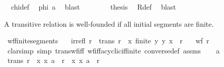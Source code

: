 \begin{isabellebody}
\ {\isacharasterisk}{\kern0pt}{\isacharasterisk}{\kern0pt}\ chi{\isacharunderscore}{\kern0pt}def\ \isamarkupfalse%
\ {\isachardoublequoteopen}phi\ a{\isachardoublequoteclose}\ \isamarkupfalse%
\ blast\isanewline
\ \ \isamarkupfalse%
\isanewline
\ \ \isamarkupfalse%
\ \isamarkupfalse%
\ {\isacharquery}{\kern0pt}thesis\ \isamarkupfalse%
\ R{\isacharunderscore}{\kern0pt}def\ \isamarkupfalse%
\ blast\isanewline
{}\isamarkupfalse%
%
\endisatagproof
{\isafoldproof}%
%
\isadelimproof
%
\endisadelimproof
%
\begin{isamarkuptext}%
A transitive relation is well-founded if all initial segments are finite.%
\end{isamarkuptext}\isamarkuptrue%
\isamarkupfalse%
\ wf{\isacharunderscore}{\kern0pt}finite{\isacharunderscore}{\kern0pt}segments{\isacharcolon}{\kern0pt}\isanewline
\ \ \ {\isachardoublequoteopen}irrefl\ r{\isachardoublequoteclose}\ \ {\isachardoublequoteopen}trans\ r{\isachardoublequoteclose}\ \ {\isachardoublequoteopen}{\isasymAnd}x{\isachardot}{\kern0pt}\ finite\ {\isacharbraceleft}{\kern0pt}y{\isachardot}{\kern0pt}\ {\isacharparenleft}{\kern0pt}y{\isacharcomma}{\kern0pt}\ x{\isacharparenright}{\kern0pt}\ {\isasymin}\ r{\isacharbraceright}{\kern0pt}{\isachardoublequoteclose}\isanewline
\ \ \ {\isachardoublequoteopen}wf\ {\isacharparenleft}{\kern0pt}r{\isacharparenright}{\kern0pt}{\isachardoublequoteclose}\isanewline
%
\isadelimproof
%
\endisadelimproof
%
\isatagproof
{}\isamarkupfalse%
\ {\isacharparenleft}{\kern0pt}clarsimp\ simp{\isacharcolon}{\kern0pt}\ trans{\isacharunderscore}{\kern0pt}wf{\isacharunderscore}{\kern0pt}iff\ wf{\isacharunderscore}{\kern0pt}iff{\isacharunderscore}{\kern0pt}acyclic{\isacharunderscore}{\kern0pt}if{\isacharunderscore}{\kern0pt}finite\ converse{\isacharunderscore}{\kern0pt}def\ assms{\isacharparenright}{\kern0pt}\isanewline
\ \ \isamarkupfalse%
\ a\isanewline
\ \ \isamarkupfalse%
\ {\isachardoublequoteopen}trans\ {\isacharparenleft}{\kern0pt}r\ {\isasyminter}\ {\isacharparenleft}{\kern0pt}{\isacharbraceleft}{\kern0pt}x{\isachardot}{\kern0pt}\ {\isacharparenleft}{\kern0pt}x{\isacharcomma}{\kern0pt}\ a{\isacharparenright}{\kern0pt}\ {\isasymin}\ r{\isacharbraceright}{\kern0pt}\ {\isasymtimes}\ {\isacharbraceleft}{\kern0pt}x{\isachardot}{\kern0pt}\ {\isacharparenleft}{\kern0pt}x{\isacharcomma}{\kern0pt}\ a{\isacharparenright}{\kern0pt}\ {\isasymin}\ r{\isacharbraceright}{\kern0pt}{\isacharparenright}{\kern0pt}{\isacharparenright}{\kern0pt}{\isachardoublequoteclose}\isanewline

\end{isabellebody}
